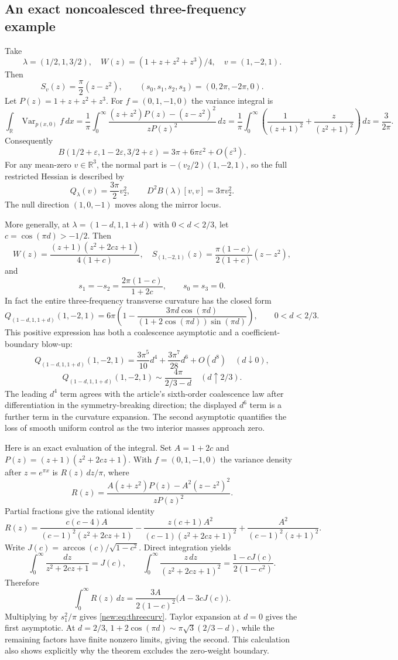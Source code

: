 \subsection{An exact noncoalesced three-frequency example}
Take
\[
 \lambda=(1/2,1,3/2),\quad W(z)=(1+z+z^2+z^3)/4,
 \quad v=(1,-2,1).
\]
Then
\[
 S_v(z)=\frac\pi2(z-z^2),\qquad
 (s_0,s_1,s_2,s_3)=(0,2\pi,-2\pi,0).
\]
Let $P(z)=1+z+z^2+z^3$. For $f=(0,1,-1,0)$ the variance integral is
\[
 \int_{\mathbb R}\operatorname{Var}_{p(x,0)}f\,dx
 =\frac1\pi\int_0^\infty
  \frac{(z+z^2)P(z)-(z-z^2)^2}{zP(z)^2}\,dz
 =\frac1\pi\int_0^\infty
  \left(\frac1{(z+1)^2}+\frac{z}{(z^2+1)^2}\right)\,dz
 =\frac3{2\pi}.
\]
Consequently
\[
 B(1/2+\varepsilon,1-2\varepsilon,3/2+\varepsilon)
 =3\pi+6\pi\varepsilon^2+O(\varepsilon^3).
\]
For any mean-zero $v\in\mathbb R^3$, the normal part is
$-(v_2/2)(1,-2,1)$, so the full restricted Hessian is described by
\[
 Q_\lambda(v)=\frac{3\pi}{2}v_2^2,
 \qquad D^2B(\lambda)[v,v]=3\pi v_2^2.
\]
The null direction $(1,0,-1)$ moves along the mirror locus.

More generally, at $\lambda=(1-d,1,1+d)$ with $0<d<2/3$, let
$c=\cos(\pi d)>-1/2$. Then
\[
 W(z)=\frac{(z+1)(z^2+2cz+1)}{4(1+c)},\quad
 S_{(1,-2,1)}(z)=\frac{\pi(1-c)}{2(1+c)}(z-z^2),
\]
and
\[
 s_1=-s_2=\frac{2\pi(1-c)}{1+2c},\qquad s_0=s_3=0.
\]
In fact the entire three-frequency transverse curvature has the closed
form
\begin{equation}\label{new:eq:threecurv}
 Q_{(1-d,1,1+d)}(1,-2,1)
 =6\pi\left(1-\frac{3\pi d\cos(\pi d)}
                    {(1+2\cos(\pi d))\sin(\pi d)}\right),
 \qquad 0<d<2/3.
\end{equation}
This positive expression has both a coalescence asymptotic and a
coefficient-boundary blow-up:
\[
 Q_{(1-d,1,1+d)}(1,-2,1)
   =\frac{3\pi^5}{10}d^4+\frac{3\pi^7}{28}d^6+O(d^8)
       \quad(d\downarrow0),
\]
\[
 Q_{(1-d,1,1+d)}(1,-2,1)
   \sim\frac{4\pi}{2/3-d}\quad(d\uparrow2/3).
\]
The leading $d^4$ term agrees with the article's sixth-order coalescence
law after differentiation in the symmetry-breaking direction; the displayed
$d^6$ term is a further term in the curvature expansion. The second asymptotic
quantifies the loss of smooth uniform control as the two interior masses
approach zero.

Here is an exact evaluation of the integral. Set $A=1+2c$ and
$P(z)=(z+1)(z^2+2cz+1)$. With $f=(0,1,-1,0)$ the variance density after
$z=e^{\pi x}$ is $R(z)\,dz/\pi$, where
\[
 R(z)=\frac{A(z+z^2)P(z)-A^2(z-z^2)^2}{zP(z)^2}.
\]
Partial fractions give the rational identity
\[
 R(z)=\frac{c(c-4)A}{(c-1)^2(z^2+2cz+1)}
      -\frac{z(c+1)A^2}{(c-1)(z^2+2cz+1)^2}
      +\frac{A^2}{(c-1)^2(z+1)^2}.
\]
Write $J(c)=\arccos(c)/\sqrt{1-c^2}$. Direct integration yields
\[
 \int_0^\infty\frac{dz}{z^2+2cz+1}=J(c),\qquad
 \int_0^\infty\frac{z\,dz}{(z^2+2cz+1)^2}
        =\frac{1-cJ(c)}{2(1-c^2)}.
\]
Therefore
\[
 \int_0^\infty R(z)\,dz
    =\frac{3A}{2(1-c)^2}\bigl(A-3cJ(c)\bigr).
\]
Multiplying by $s_1^2/\pi$ gives \eqref{new:eq:threecurv}. Taylor
expansion at $d=0$ gives the first asymptotic. At $d=2/3$,
$1+2\cos(\pi d)\sim\pi\sqrt3(2/3-d)$, while the remaining factors
have finite nonzero limits, giving the second. This calculation also
shows explicitly why the theorem excludes the zero-weight boundary.

